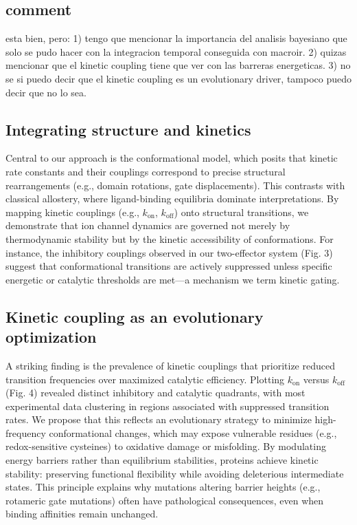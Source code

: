 \documentclass[a4paper,12pt]{article}
\begin{document}
	\subsection{comment}
		esta bien, pero: 
		1) tengo que mencionar la importancia del analisis bayesiano que solo se pudo hacer con la integracion temporal conseguida con macroir.
		2) quizas mencionar que el kinetic coupling tiene que ver con las barreras energeticas. 
		3) no se si puedo decir que el kinetic coupling es un evolutionary driver, tampoco puedo decir que no lo sea. 
	
	
	
	\subsection{Integrating structure and kinetics}  
	Central to our approach is the conformational model, which posits that kinetic rate constants and their couplings correspond to precise structural rearrangements (e.g., domain rotations, gate displacements). This contrasts with classical allostery, where ligand-binding equilibria dominate interpretations. By mapping kinetic couplings (e.g., \( k_{\text{on}} \), \( k_{\text{off}} \)) onto structural transitions, we demonstrate that ion channel dynamics are governed not merely by thermodynamic stability but by the kinetic accessibility of conformations. For instance, the inhibitory couplings observed in our two-effector system (Fig. 3) suggest that conformational transitions are actively suppressed unless specific energetic or catalytic thresholds are met—a mechanism we term kinetic gating.  
	
	
	\subsection{Kinetic coupling as an evolutionary optimization} 
	A striking finding is the prevalence of kinetic couplings that prioritize reduced transition frequencies over maximized catalytic efficiency. Plotting \( k_{\text{on}} \) versus \( k_{\text{off}} \) (Fig. 4) revealed distinct inhibitory and catalytic quadrants, with most experimental data clustering in regions associated with suppressed transition rates. We propose that this reflects an evolutionary strategy to minimize high-frequency conformational changes, which may expose vulnerable residues (e.g., redox-sensitive cysteines) to oxidative damage or misfolding. By modulating energy barriers rather than equilibrium stabilities, proteins achieve kinetic stability: preserving functional flexibility while avoiding deleterious intermediate states. This principle explains why mutations altering barrier heights (e.g., rotameric gate mutations) often have pathological consequences, even when binding affinities remain unchanged.  
	
\end{document}
